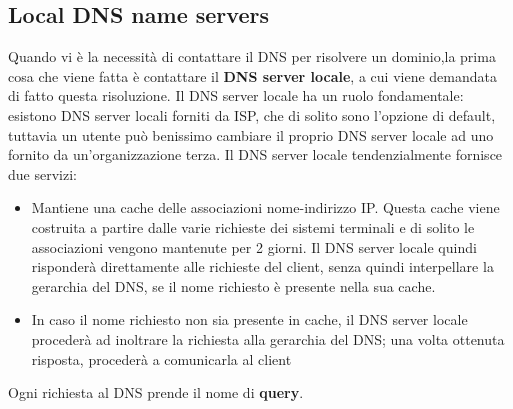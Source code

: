 \documentclass[12pt]{article}
\begin{document}
\subsection{Local DNS name servers}
Quando vi è la necessità di contattare il DNS per risolvere un dominio,la prima cosa che viene fatta è contattare il \textbf{DNS server locale}, a cui viene
demandata di fatto questa risoluzione. Il DNS server locale ha un ruolo fondamentale: esistono DNS server locali forniti da ISP, che di solito sono l'opzione di default,
tuttavia un utente può benissimo cambiare il proprio DNS server locale ad uno fornito da un'organizzazione terza. Il DNS server locale tendenzialmente fornisce due servizi:
\begin{itemize}
    \item Mantiene una cache delle associazioni nome-indirizzo IP. Questa cache viene costruita a partire dalle varie richieste dei sistemi terminali e di solito le associazioni
    vengono mantenute per 2 giorni. Il DNS server locale quindi risponderà direttamente alle richieste del client, senza quindi interpellare la gerarchia del DNS, se il nome richiesto è presente
    nella sua cache.
    \item In caso il nome richiesto non sia presente in cache, il DNS server locale procederà ad inoltrare la richiesta alla gerarchia del DNS; una volta ottenuta risposta, procederà a comunicarla al client
\end{itemize}
Ogni richiesta al DNS prende il nome di \textbf{query}.
\end{document}
